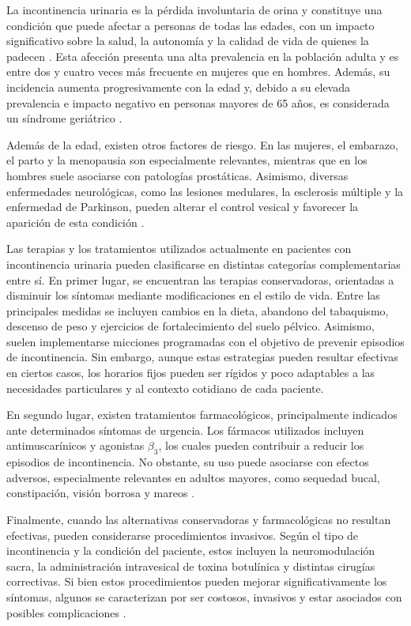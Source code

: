 \documentclass[12pt,a4paper]{article}
\begin{document}
La incontinencia urinaria es la pérdida involuntaria de orina y constituye una condición que
puede afectar a personas de todas las edades, con un impacto significativo sobre la salud, la
autonomía y la calidad de vida de quienes la padecen \cite{abrams2002standardisation}. Esta
afección presenta una alta prevalencia en la población adulta y es entre dos y cuatro veces más
frecuente en mujeres que en hombres. Además, su incidencia aumenta progresivamente con la edad
y, debido a su elevada prevalencia e impacto negativo en personas mayores de 65 años, es
considerada un síndrome geriátrico \cite{robles2006incontinencia}.

Además de la edad, existen otros factores de riesgo. En las mujeres, el embarazo, el parto y la
menopausia son especialmente relevantes, mientras que en los hombres suele asociarse
con patologías prostáticas. Asimismo, diversas enfermedades neurológicas, como las lesiones
medulares, la esclerosis múltiple y la enfermedad de Parkinson, pueden alterar el control vesical
y favorecer la aparición de esta condición \cite{leslie2024incontinence}.

Las terapias y los tratamientos utilizados actualmente en pacientes con incontinencia urinaria
pueden clasificarse en distintas categorías complementarias entre sí. En primer lugar, se
encuentran las terapias conservadoras, orientadas a disminuir los síntomas mediante modificaciones
en el estilo de vida. Entre las principales medidas se incluyen cambios en la dieta, abandono del
tabaquismo, descenso de peso y ejercicios de fortalecimiento del suelo pélvico. Asimismo, suelen
implementarse micciones programadas con el objetivo de prevenir episodios de incontinencia. Sin
embargo, aunque estas estrategias pueden resultar efectivas en ciertos casos, los horarios fijos
pueden ser rígidos y poco adaptables a las necesidades particulares y al contexto cotidiano de
cada paciente.

En segundo lugar, existen tratamientos farmacológicos, principalmente indicados ante determinados
síntomas de urgencia. Los fármacos utilizados incluyen antimuscarínicos y agonistas $\beta_3$, los
cuales pueden contribuir a reducir los episodios de incontinencia. No obstante, su uso puede
asociarse con efectos adversos, especialmente relevantes en adultos mayores, como sequedad bucal,
constipación, visión borrosa y mareos \cite{eau2025femaleLUTS}.

Finalmente, cuando las alternativas conservadoras y farmacológicas no resultan efectivas, pueden
considerarse procedimientos invasivos. Según el tipo de incontinencia y la condición del paciente,
estos incluyen la neuromodulación sacra, la administración intravesical de toxina botulínica y
distintas cirugías correctivas. Si bien estos procedimientos pueden mejorar significativamente los
síntomas, algunos se caracterizan por ser costosos, invasivos y estar asociados con posibles
complicaciones \cite{eau2025femaleLUTS}.
\end{document}
